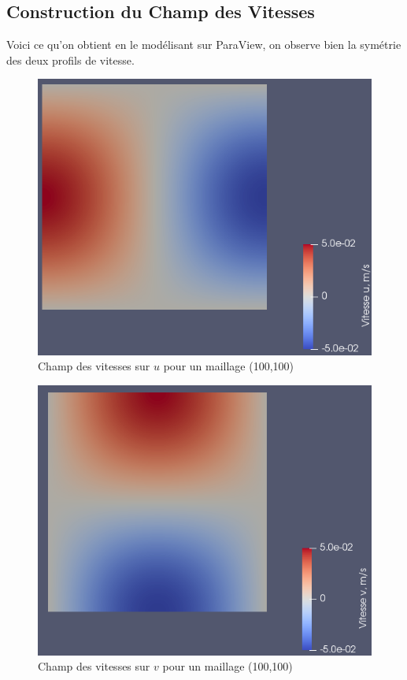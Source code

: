 \documentclass[a4paper,oneside]{article}
\begin{document}
\subsection{Construction du Champ des Vitesses}

Voici ce qu'on obtient en le modélisant sur ParaView, on observe bien la symétrie des deux profils de vitesse.

\begin{figure}[h!]
\centering
        \includegraphics[scale=0.4]{Champ_Vitesse_Maillage/Champ_Vitesse_u.png}
        \caption{Champ des vitesses sur $u$ pour un maillage (100,100)}

\end{figure}

\begin{figure}[h!]
	\centering
        \includegraphics[scale=0.4]{Champ_Vitesse_Maillage/Champ_Vitesse_v.png}
        \caption{Champ des vitesses sur $v$ pour un maillage (100,100)}
\end{figure}
\end{document}
